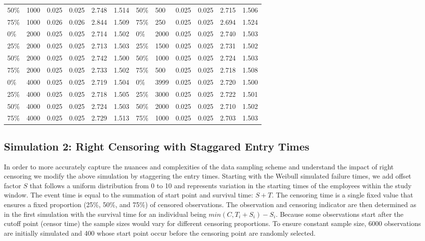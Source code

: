 \documentclass[12pt,letterpaper]{article}
\begin{document}
\begin{table}[!htbp]
\begin{tabular}{@{}C{1.8cm}lllll||C{1.8cm}lllll@{}}
 		50\% & 1000   & 0.025  & 0.025 & 2.748 & 1.514 & 50\%  & 500  & 0.025 & 0.025 & 2.715 & 1.506 \\
 		75\% & 1000   & 0.026  & 0.026 & 2.844 & 1.509 & 75\%  & 250  & 0.025 & 0.025 & 2.694 & 1.524 \\
 		0\%  & 2000   & 0.025  & 0.025 & 2.714 & 1.502 & 0\%   & 2000 & 0.025 & 0.025 & 2.740 & 1.503 \\
 		25\% & 2000   & 0.025  & 0.025 & 2.713 & 1.503 & 25\%  & 1500 & 0.025 & 0.025 & 2.731 & 1.502 \\
 		50\% & 2000   & 0.025  & 0.025 & 2.742 & 1.500 & 50\%  & 1000 & 0.025 & 0.025 & 2.724 & 1.503 \\
 		75\% & 2000   & 0.025  & 0.025 & 2.733 & 1.502 & 75\%  & 500  & 0.025 & 0.025 & 2.718 & 1.508 \\
 		0\%  & 4000   & 0.025  & 0.025 & 2.719 & 1.504 & 0\%   & 3999 & 0.025 & 0.025 & 2.720 & 1.500 \\
 		25\% & 4000   & 0.025  & 0.025 & 2.718 & 1.505 & 25\%  & 3000 & 0.025 & 0.025 & 2.722 & 1.501 \\
 		50\% & 4000   & 0.025  & 0.025 & 2.724 & 1.503 & 50\%  & 2000 & 0.025 & 0.025 & 2.710 & 1.502 \\
 		75\% & 4000  & 0.025 & 0.025  & 2.729 & 1.513 & 75\%  & 1000  & 0.025  & 0.025 & 2.703 & 1.503 \\ \bottomrule
 	\end{tabular}
 	\label{tab:rightcensor}%
 \end{table}
 
 

\subsection{Simulation 2: Right Censoring with Staggared Entry Times} \label{rightcensor:sim2}

In order to more accurately capture the nuances and complexities of the data sampling scheme and understand the impact of right censoring we modify the above simulation by staggering the entry times.  Starting with the Weibull simulated failure times, we add offset factor $S$ that follows a uniform distribution from 0 to 10 and represents variation in the starting times of the employees within the study window. The event time is equal to the summation of start point and survival time: $S+T$. The censoring time is a single fixed value that ensures a fixed proportion (25\%, 50\%, and 75\%) of censored observations.  The observation and censoring indicator are then determined as in the first simulation with the survival time for an individual being $min(C,T_i+S_i) - S_i$. Because some observations start after the cutoff point (censor time) the sample sizes would vary for different censoring proportions.  To ensure constant sample size, 6000 observations are initially simulated and 400 whose start point occur before the censoring point are randomly selected.
\end{document}

